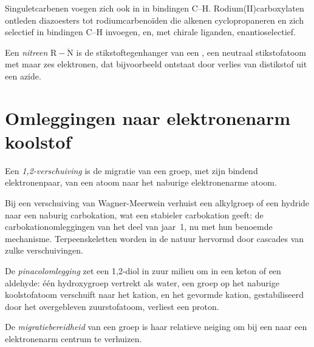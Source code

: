 Singuletcarbenen voegen zich ook in in bindingen C--H. Rodium(II)carboxylaten
ontleden diazoesters tot rodiumcarbenoïden die alkenen cyclopropaneren en
zich selectief in bindingen C--H invoegen, en, met chirale liganden,
enantioselectief.

\begin{definition}[Nitrenen]\label{def:b3:radicals-carbenes:nitrene}
Een \emph{nitreen} $\mathrm{R{-}\ddot N}$ is de stikstoftegenhanger van een ,
een neutraal stikstofatoom met maar zes elektronen, dat bijvoorbeeld
ontstaat door verlies van distikstof uit een azide.
\end{definition}

\section{Omleggingen naar elektronenarm koolstof}

\begin{definition}[1,2-Verschuiving]\label{def:b3:radicals-carbenes:shift}
Een \emph{1,2-verschuiving} is de migratie van een
groep, met zijn bindend elektronenpaar, van een atoom naar het naburige
elektronenarme atoom.
\end{definition}

Bij een verschuiving van Wagner-Meerwein verhuist een alkylgroep of een
hydride naar een naburig carbokation, wat een stabieler carbokation
geeft: de carbokationomleggingen van het deel van jaar~1, nu met hun
benoemde mechanisme. Terpeenskeletten worden in de natuur hervormd door
cascades van zulke verschuivingen.

\begin{definition}[Pinacolomlegging]\label{def:b3:radicals-carbenes:pinacol}
De \emph{pinacolomlegging} zet een 1,2-diol in
zuur milieu om in een keton of een aldehyde: één hydroxygroep vertrekt
als water, een groep op het naburige koolstofatoom verschuift naar het
kation, en het gevormde kation, gestabiliseerd door het overgebleven
zuurstofatoom, verliest een proton.
\end{definition}

\begin{definition}[Migratiebereidheid]\label{def:b3:radicals-carbenes:migratory}
De \emph{migratiebereidheid} van een groep is
haar relatieve neiging om bij een  naar een elektronenarm
centrum te verhuizen.
\end{definition}

